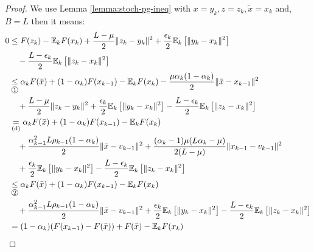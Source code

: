 \documentclass[12pt]{article}
\newcommand{\expect}{\ensuremath{\mathbb E}}
\begin{document}
\begin{proof}
            \par
            We use Lemma \ref{lemma:stoch-pg-ineq} with $x = y_k, z = z_k, \tilde x = x_{k}$ and, $B = L$ then it means: 
            {\allowdisplaybreaks
            \begin{align*}
                0 &\le 
                F(z_k) - \expect_k F(x_k) 
                + \frac{L - \mu}{2}\Vert z_k - y_k\Vert^2 
                + \frac{\epsilon_k}{2}\expect_k \left[\Vert y_k - x_k \Vert^2\right] 
                    \\&\quad
                    - \frac{L - \epsilon_k}{2}\expect_k \left[\Vert z_k - x_k\Vert^2\right]
                \\
                &\underset{\circled{1}}{\le} 
                \alpha_k F(\bar x) + (1 - \alpha_k)F(x_{k - 1}) - \expect_k F(x_k) - \frac{\mu\alpha_k(1 - \alpha_k)}{2}\Vert \bar x - x_{k - 1}\Vert^2
                    \\&\quad 
                    + \frac{L - \mu}{2}\Vert z_k - y_k\Vert^2 
                    + \frac{\epsilon_k}{2}\expect_k \left[\Vert y_k - x_k \Vert^2\right] 
                    - \frac{L - \epsilon_k}{2}\expect_k \left[\Vert z_k - x_k\Vert^2\right]
                \\
                &\underset{\text{(d)}}{=}
                \alpha_k F(\bar x) + (1 - \alpha_k)F(x_{k - 1}) - \expect_k F(x_k) 
                    \\&\quad 
                    + \frac{\alpha_{k - 1}^2L \rho_{k - 1}(1 - \alpha_k)}{2}\Vert \bar x - v_{k - 1}\Vert^2
                    + \frac{(\alpha_k - 1)\mu(L\alpha_k - \mu)}{2(L - \mu)}\Vert x_{k - 1} - v_{k - 1}\Vert^2
                    \\&\quad 
                    + \frac{\epsilon_k}{2}\expect_k \left[\Vert y_k - x_k \Vert^2\right] 
                    - \frac{L - \epsilon_k}{2}\expect_k \left[\Vert z_k - x_k\Vert^2\right]
                \\&\underset{\circled{2}}{\le}
                \alpha_k F(\bar x) + (1 - \alpha_k)F(x_{k - 1}) - \expect_k F(x_k) 
                    \\&\quad 
                    + \frac{\alpha_{k - 1}^2L \rho_{k - 1}(1 - \alpha_k)}{2}\Vert \bar x - v_{k - 1}\Vert^2
                    + \frac{\epsilon_k}{2}\expect_k \left[\Vert y_k - x_k \Vert^2\right] 
                    - \frac{L - \epsilon_k}{2}\expect_k \left[\Vert z_k - x_k\Vert^2\right]
                \\&= 
                (1 - \alpha_k)(F(x_{k - 1}) - F(\bar x)) + F(\bar x) - \expect_kF(x_k)

\end{align*}}
\end{proof}
\end{document}
